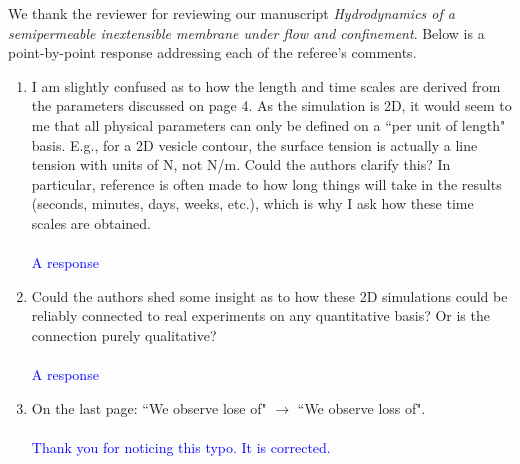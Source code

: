 \documentclass[11pt]{article}
\newcommand{\response}[1]{\textcolor{blue}{#1}}
\begin{document}
We thank the reviewer for reviewing our manuscript \textit{Hydrodynamics
of a semipermeable inextensible membrane under flow and confinement}.
Below is a point-by-point response addressing each of the referee's
comments.
\begin{enumerate}
  \item I am slightly confused as to how the length and time scales are
    derived from the parameters discussed on page 4. As the simulation
    is 2D, it would seem to me that all physical parameters can only be
    defined on a ``per unit of length" basis. E.g., for a 2D vesicle
    contour, the surface tension is actually a line tension with units
    of N, not N/m. Could the authors clarify this?  In particular,
    reference is often made to how long things will take in the results
    (seconds, minutes, days, weeks, etc.), which is why I ask how these
    time scales are obtained. \\ \\
    \response{A response}

  \item Could the authors shed some insight as to how these 2D
    simulations could be reliably connected to real experiments on any
    quantitative basis? Or is the connection purely qualitative? \\ \\
    \response{A response}

  \item On the last page: ``We observe lose of" $\rightarrow$ ``We
    observe loss of". \\ \\
    \response{Thank you for noticing this typo. It is corrected.}


\end{enumerate}
\end{document}
